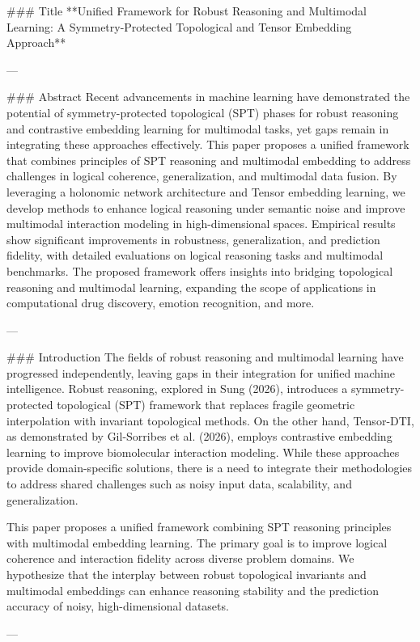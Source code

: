 ### Title  
**Unified Framework for Robust Reasoning and Multimodal Learning: A Symmetry-Protected Topological and Tensor Embedding Approach**

---

### Abstract  
Recent advancements in machine learning have demonstrated the potential of symmetry-protected topological (SPT) phases for robust reasoning and contrastive embedding learning for multimodal tasks, yet gaps remain in integrating these approaches effectively. This paper proposes a unified framework that combines principles of SPT reasoning and multimodal embedding to address challenges in logical coherence, generalization, and multimodal data fusion. By leveraging a holonomic network architecture and Tensor embedding learning, we develop methods to enhance logical reasoning under semantic noise and improve multimodal interaction modeling in high-dimensional spaces. Empirical results show significant improvements in robustness, generalization, and prediction fidelity, with detailed evaluations on logical reasoning tasks and multimodal benchmarks. The proposed framework offers insights into bridging topological reasoning and multimodal learning, expanding the scope of applications in computational drug discovery, emotion recognition, and more.

---

### Introduction  
The fields of robust reasoning and multimodal learning have progressed independently, leaving gaps in their integration for unified machine intelligence. Robust reasoning, explored in Sung (2026), introduces a symmetry-protected topological (SPT) framework that replaces fragile geometric interpolation with invariant topological methods. On the other hand, Tensor-DTI, as demonstrated by Gil-Sorribes et al. (2026), employs contrastive embedding learning to improve biomolecular interaction modeling. While these approaches provide domain-specific solutions, there is a need to integrate their methodologies to address shared challenges such as noisy input data, scalability, and generalization.

This paper proposes a unified framework combining SPT reasoning principles with multimodal embedding learning. The primary goal is to improve logical coherence and interaction fidelity across diverse problem domains. We hypothesize that the interplay between robust topological invariants and multimodal embeddings can enhance reasoning stability and the prediction accuracy of noisy, high-dimensional datasets.

---

